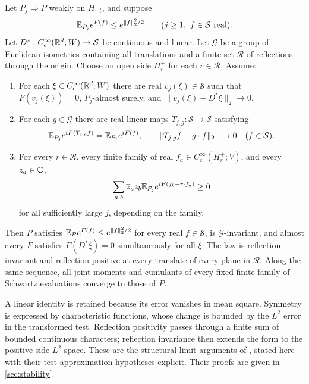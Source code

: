 \documentclass[11pt,letterpaper,reqno]{amsart}
\begin{document}
\begin{theorem}
\label{thm:structural-limit}
Let \(P_j\Rightarrow P\) weakly on \(H_{-t}\), and suppose
\begin{equation}\label{eq:common-gaussian}
 \mathbb E_{P_j}e^{F(f)}\le e^{\|f\|_2^2/2}
 \qquad(j\ge1,\ f\in\mathcal S\text{ real}).
\end{equation}
Let \(D^*:C_c^\infty(\mathbb R^d;W)\to\mathcal S\) be continuous and
linear. Let \(\mathcal G\) be a group of Euclidean isometries
containing all translations and a finite set \(\mathcal R\) of
reflections through the origin. Choose an open side \(H_r^+\) for
each \(r\in\mathcal R\). Assume:
\begin{enumerate}[label=(\roman*),leftmargin=*]
\item\label{hyp:identity}
For each \(\xi\in C_c^\infty(\mathbb R^d;W)\) there are real
\(v_j(\xi)\in\mathcal S\) such that \(F(v_j(\xi))=0\),
\(P_j\)-almost surely, and
\(\|v_j(\xi)-D^*\xi\|_2\to0\).
\item\label{hyp:symmetry}
For each \(g\in\mathcal G\) there are real linear maps
\(T_{j,g}:\mathcal S\to\mathcal S\) satisfying
\[
 \mathbb E_{P_j}e^{iF(T_{j,g}f)}=\mathbb E_{P_j}e^{iF(f)},\qquad
 \|T_{j,g}f-g\cdot f\|_2\longrightarrow0
 \quad(f\in\mathcal S).
\]
\item\label{hyp:reflection}
For every \(r\in\mathcal R\), every finite family of real
\(f_a\in C_c^\infty(H_r^+;V)\), and every \(z_a\in\mathbb C\),
\begin{equation}\label{eq:rp-approx}
 \sum_{a,b}\overline z_a z_b
 \mathbb E_{P_j}e^{iF(f_b-r\cdot f_a)}\ge0
\end{equation}
for all sufficiently large \(j\), depending on the family.
\end{enumerate}
Then \(P\) satisfies \(\mathbb E_Pe^{F(f)}\le e^{\|f\|_2^2/2}\)
for every real \(f\in\mathcal S\), is
\(\mathcal G\)-invariant, and almost every \(F\) satisfies
\(F(D^*\xi)=0\) simultaneously for all \(\xi\).
The law is reflection invariant and reflection positive at every
translate of every plane in \(\mathcal R\).
Along the same sequence, all joint moments and cumulants of every
fixed finite family of Schwartz evaluations converge to those of \(P\).
\end{theorem}

A linear identity is retained because its error vanishes in mean
square. Symmetry is expressed by characteristic functions, whose
change is bounded by the \(L^2\) error in the transformed test.
Reflection positivity passes through a finite sum of bounded
continuous characters; reflection invariance then extends the form
to the positive-side \(L^2\) space. These are the structural limit
arguments of \cite[Sections~6.3 and~6.5]{QED3Manuscript}, stated
here with their test-approximation hypotheses explicit. Their proofs
are given in \cref{sec:stability}.
\end{document}
